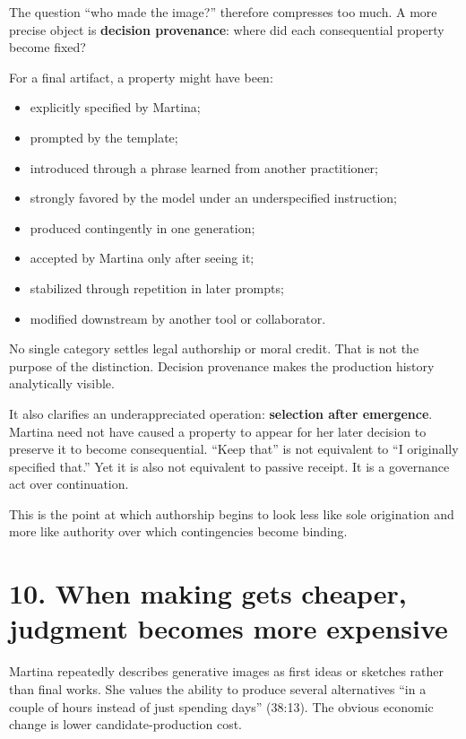 \documentclass[
  11pt,
  letterpaper,
]{article}
\providecommand{\tightlist}{%
  \setlength{\itemsep}{0pt}\setlength{\parskip}{0pt}}
\begin{document}
The question ``who made the image?'' therefore compresses too much. A
more precise object is \textbf{decision provenance}: where did each
consequential property become fixed?

For a final artifact, a property might have been:

\begin{itemize}
\tightlist
\item
  explicitly specified by Martina;
\item
  prompted by the template;
\item
  introduced through a phrase learned from another practitioner;
\item
  strongly favored by the model under an underspecified instruction;
\item
  produced contingently in one generation;
\item
  accepted by Martina only after seeing it;
\item
  stabilized through repetition in later prompts;
\item
  modified downstream by another tool or collaborator.
\end{itemize}

No single category settles legal authorship or moral credit. That is not
the purpose of the distinction. Decision provenance makes the production
history analytically visible.

It also clarifies an underappreciated operation: \textbf{selection after
emergence}. Martina need not have caused a property to appear for her
later decision to preserve it to become consequential. ``Keep that'' is
not equivalent to ``I originally specified that.'' Yet it is also not
equivalent to passive receipt. It is a governance act over continuation.

This is the point at which authorship begins to look less like sole
origination and more like authority over which contingencies become
binding.

\section{10. When making gets cheaper, judgment becomes more
expensive}\label{when-making-gets-cheaper-judgment-becomes-more-expensive}

Martina repeatedly describes generative images as first ideas or
sketches rather than final works. She values the ability to produce
several alternatives ``in a couple of hours instead of just spending
days'' (38:13). The obvious economic change is lower
candidate-production cost.
\end{document}
